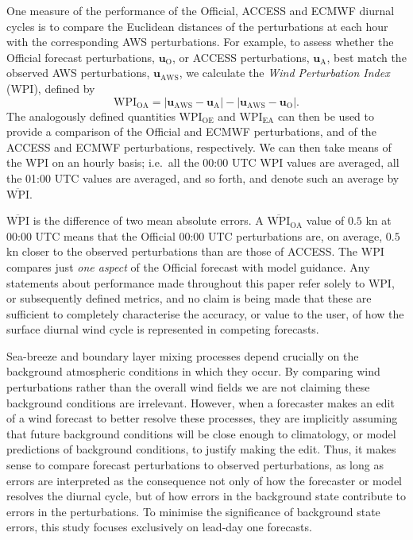 \documentclass[twocol]{ametsoc}
\begin{document}
One measure of the performance of the Official, ACCESS and ECMWF diurnal cycles is to compare the Euclidean distances of the perturbations at each hour with the corresponding AWS perturbations. For example, to assess whether the Official forecast perturbations, $\boldsymbol{u}_{\text{O}}$, or ACCESS perturbations, $\boldsymbol{u}_{\text{A}}$, best match the observed AWS perturbations, $\boldsymbol{u}_{\text{AWS}}$, we calculate the \textit{Wind Perturbation Index} (WPI), defined by 
\begin{equation}
\text{WPI}_\text{OA} = \left\lvert \boldsymbol{u}_{\text{AWS}}-\boldsymbol{u}_{\text{A}} \right\rvert - \left\lvert \boldsymbol{u}_{\text{AWS}}-\boldsymbol{u}_{\text{O}} \right\rvert. \label{Eq:WPI}
\end{equation} 
The analogously defined quantities $\text{WPI}_\text{OE}$ and $\text{WPI}_\text{EA}$ can then be used to provide a comparison of the Official and ECMWF perturbations, and of the ACCESS and ECMWF perturbations, respectively. We can then take means of the WPI on an hourly basis; i.e.~all the 00:00 UTC WPI values are averaged, all the 01:00 UTC values are averaged, and so forth, and denote such an average by $\overline{\text{WPI}}$. 

$\overline{\text{WPI}}$ is the difference of two mean absolute errors. A $\overline{\text{WPI}}_\text{OA}$ value of $0.5$ kn at 00:00 UTC means that the Official 00:00 UTC perturbations are, on average, $0.5$ kn closer to the observed perturbations than are those of ACCESS. The $\text{WPI}$ compares just \textit{one aspect} of the Official forecast with model guidance. Any statements about performance made throughout this paper refer solely to WPI, or subsequently defined metrics, and no claim is being made that these are sufficient to completely characterise the accuracy, or value to the user, of how the surface diurnal wind cycle is represented in competing forecasts.

Sea-breeze and boundary layer mixing processes depend crucially on the background atmospheric conditions in which they occur. By comparing wind perturbations rather than the overall wind fields we are not claiming these background conditions are irrelevant. However, when a forecaster makes an edit of a wind forecast to better resolve these processes, they are implicitly assuming that future background conditions will be close enough to climatology, or model predictions of background conditions, to justify making the edit. Thus, it makes sense to compare forecast perturbations to observed perturbations, as long as errors are interpreted as the consequence not only of how the forecaster or model resolves the diurnal cycle, but of how errors in the background state contribute to errors in the perturbations. To minimise the significance of background state errors, this study focuses exclusively on lead-day one forecasts.
\end{document}
